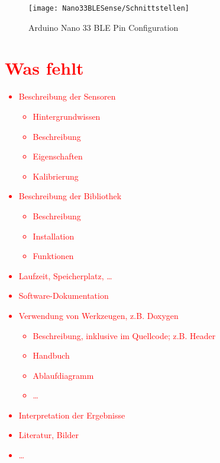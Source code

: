 \begin{figure}[ht]
    \centering
    \texttt{[image: Nano33BLESense/Schnittstellen]}
    \caption{Arduino Nano 33 BLE Pin Configuration}
    \label{Schnittstellen}
\end{figure}


\section{\textcolor{red}{Was fehlt}}

\textcolor{red}{
\begin{itemize}
  \item Beschreibung der Sensoren
    \begin{itemize}
      \item Hintergrundwissen
      \item Beschreibung
      \item Eigenschaften
      \item Kalibrierung
    \end{itemize}
  \item Beschreibung der Bibliothek
    \begin{itemize}
      \item Beschreibung
      \item Installation
      \item Funktionen
    \end{itemize}
  \item Laufzeit, Speicherplatz, \ldots
  \item Software-Dokumentation
  \item Verwendung von Werkzeugen, z.B. Doxygen
    \begin{itemize}
      \item Beschreibung, inklusive im Quellcode; z.B. Header
      \item Handbuch
      \item Ablaufdiagramm
      \item \ldots
\end{itemize}
\item Interpretation der Ergebnisse
\item Literatur, Bilder
\item \ldots
\end{itemize}
}


